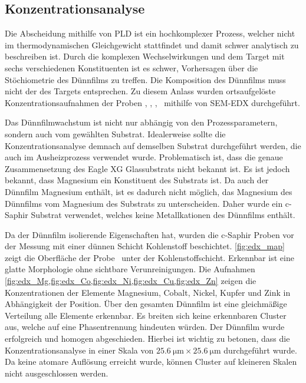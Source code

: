 \subsection{Konzentrationsanalyse}\label{subsec:edx-analyse}
Die Abscheidung mithilfe von PLD ist ein hochkomplexer Prozess, welcher nicht im thermodynamischen Gleichgewicht
stattfindet und damit schwer analytisch zu beschreiben ist.
Durch die komplexen Wechselwirkungen und dem Target mit sechs verschiedenen Konstituenten ist es schwer, Vorhersagen
über die Stöchiometrie des Dünnfilms zu treffen.
Die Komposition des Dünnfilms muss nicht der des Targets entsprechen.
Zu diesem Anlass wurden ortsaufgelöste Konzentrationsaufnahmen der Proben \csamplethree, \csampleone, \csampletwo,
\csamplefour\ mithilfe von SEM-EDX durchgeführt.

Das Dünnfilmwachstum ist nicht nur abhängig von den Prozessparametern, sondern auch vom gewählten Substrat.
Idealerweise sollte die Konzentrationsanalyse demnach auf demselben Substrat durchgeführt werden, die auch im
Ausheizprozess verwendet wurde.
Problematisch ist, dass die genaue Zusammensetzung des Eagle XG Glassubstrats nicht bekannt ist.
Es ist jedoch bekannt, dass Magnesium ein Konstituent des Substrats ist.
Da auch der Dünnfilm Magnesium enthält, ist es dadurch nicht möglich, das Magnesium des Dünnfilms vom Magnesium des
Substrats zu unterscheiden.
Daher wurde ein c-Saphir Substrat verwendet, welches keine Metallkationen des Dünnfilms enthält.

Da der Dünnfilm isolierende Eigenschaften hat, wurden die c-Saphir Proben vor der Messung mit einer dünnen Schicht
Kohlenstoff beschichtet.
\cref{fig:edx_map} zeigt die Oberfläche der Probe \csampleone\ unter der Kohlenstoffschicht.
Erkennbar ist eine glatte Morphologie ohne sichtbare Verunreinigungen.
Die Aufnahmen \cref{fig:edx_Mg,fig:edx_Co,fig:edx_Ni,fig:edx_Cu,fig:edx_Zn} zeigen die Konzentrationen der
Elemente Magnesium, Cobalt, Nickel, Kupfer und Zink in Abhängigkeit der Position.
Über den gesamten Dünnfilm ist eine gleichmäßige Verteilung alle Elemente erkennbar.
Es breiten sich keine erkennbaren Cluster aus, welche auf eine Phasentrennung hindeuten würden.
Der Dünnfilm wurde erfolgreich und homogen abgeschieden.
Hierbei ist wichtig zu betonen, dass die Konzentrationsanalyse in einer Skala von $\qty{25.6}{\micro\meter} \times
\qty{25.6}{\micro\meter}$ durchgeführt wurde.
Da keine atomare Auflösung erreicht wurde, können Cluster auf kleineren Skalen nicht ausgeschlossen werden.

